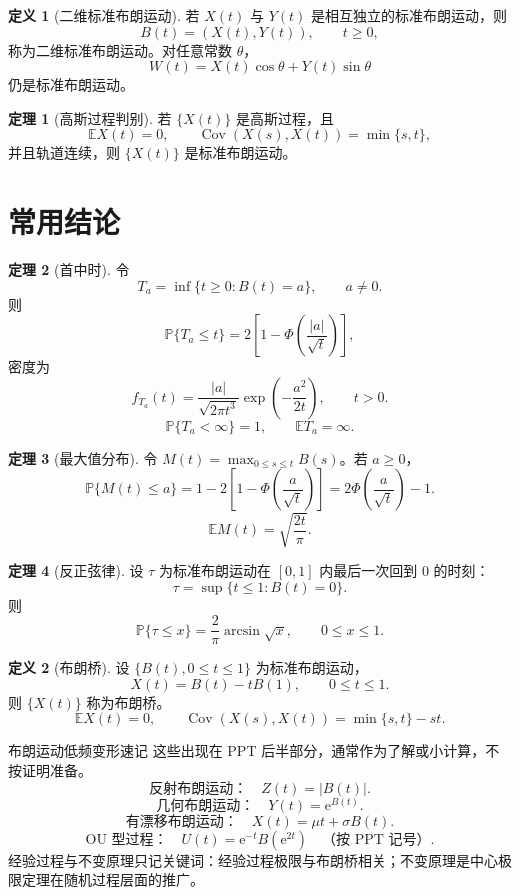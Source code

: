 \documentclass[12pt,a4paper,openany]{ctexrep}
\theoremstyle{definition}
\newtheorem{definition}{定义}[section]
\newtheorem{theorem}{定理}[section]
\newcommand{\E}{\mathbb{E}}
\newcommand{\Cov}{\operatorname{Cov}}
\newcommand{\Pp}{\mathbb{P}}
\newcommand{\e}{\mathrm{e}}
\begin{document}
\begin{definition}[二维标准布朗运动]
若 $X(t)$ 与 $Y(t)$ 是相互独立的标准布朗运动，则
\[
B(t)=(X(t),Y(t)),\qquad t\ge0,
\]
称为二维标准布朗运动。对任意常数 $\theta$，
\[
W(t)=X(t)\cos\theta+Y(t)\sin\theta
\]
仍是标准布朗运动。
\end{definition}

\begin{theorem}[高斯过程判别]
若 $\{X(t)\}$ 是高斯过程，且
\[
\E X(t)=0,\qquad \Cov(X(s),X(t))=\min\{s,t\},
\]
并且轨道连续，则 $\{X(t)\}$ 是标准布朗运动。
\end{theorem}

\section{常用结论}

\begin{theorem}[首中时]
令
\[
T_a=\inf\{t\ge0:B(t)=a\},\qquad a\ne0.
\]
则
\[
\Pp\{T_a\le t\}
=
2\left[1-\Phi\left(\frac{|a|}{\sqrt t}\right)\right],
\]
密度为
\[
f_{T_a}(t)=\frac{|a|}{\sqrt{2\pi t^3}}\exp\left(-\frac{a^2}{2t}\right),\qquad t>0.
\]
\[
\Pp\{T_a<\infty\}=1,\qquad \E T_a=\infty.
\]
\end{theorem}

\begin{theorem}[最大值分布]
令 $M(t)=\max_{0\le s\le t}B(s)$。若 $a\ge0$，
\[
\Pp\{M(t)\le a\}
=
1-2\left[1-\Phi\left(\frac{a}{\sqrt t}\right)\right]
=
2\Phi\left(\frac{a}{\sqrt t}\right)-1.
\]
\[
\E M(t)=\sqrt{\frac{2t}{\pi}}.
\]
\end{theorem}

\begin{theorem}[反正弦律]
设 $\tau$ 为标准布朗运动在 $[0,1]$ 内最后一次回到 $0$ 的时刻：
\[
\tau=\sup\{t\le1:B(t)=0\}.
\]
则
\[
\Pp\{\tau\le x\}=\frac2\pi\arcsin\sqrt{x},\qquad 0\le x\le1.
\]
\end{theorem}

\begin{definition}[布朗桥]
设 $\{B(t),0\le t\le1\}$ 为标准布朗运动，
\[
X(t)=B(t)-tB(1),\qquad 0\le t\le1.
\]
则 $\{X(t)\}$ 称为布朗桥。
\[
\E X(t)=0,\qquad
\Cov(X(s),X(t))=\min\{s,t\}-st.
\]
\end{definition}

\begin{reviewbox}{布朗运动低频变形速记}
这些出现在 PPT 后半部分，通常作为了解或小计算，不按证明准备。
\[
\text{反射布朗运动：}\quad Z(t)=|B(t)|.
\]
\[
\text{几何布朗运动：}\quad Y(t)=\e^{B(t)}.
\]
\[
\text{有漂移布朗运动：}\quad X(t)=\mu t+\sigma B(t).
\]
\[
\text{OU 型过程：}\quad U(t)=\e^{-t}B(\e^{2t})\quad\text{（按 PPT 记号）}.
\]
经验过程与不变原理只记关键词：经验过程极限与布朗桥相关；不变原理是中心极限定理在随机过程层面的推广。
\end{reviewbox}
\end{document}
